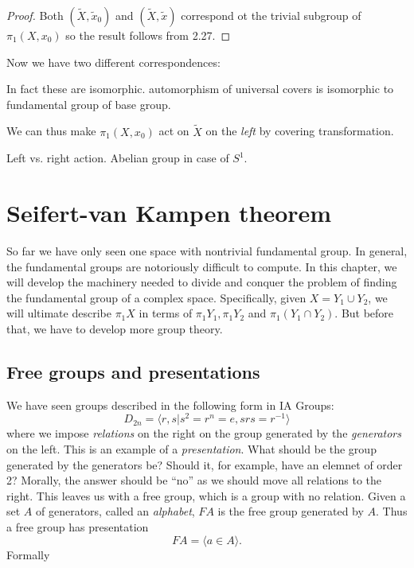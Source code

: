 \documentclass[a4paper]{article}
\begin{document}
\begin{proof}
  Both \((\tilde X, \tilde x_0)\) and \((\tilde X, \tilde x)\) correspond ot the trivial subgroup of \(\pi_1(X, x_0)\) so the result follows from 2.27.
\end{proof}

Now we have two different correspondences:

\blindtext

In fact these are isomorphic. automorphism of universal covers is isomorphic to fundamental group of base group.

We can thus make \(\pi_1(X, x_0)\) act on \(\tilde X\) on the \emph{left} by covering transformation.
\begin{remark}
  Left vs. right action. Abelian group in case of \(S^1\).
\end{remark}

\section{Seifert-van Kampen theorem}

So far we have only seen one space with nontrivial fundamental group. In general, the fundamental groups are notoriously difficult to compute. In this chapter, we will develop the machinery needed to divide and conquer the problem of finding the fundamental group of a complex space. Specifically, given \(X = Y_1 \cup Y_2\), we will ultimate describe \(\pi_1X\) in terms of \(\pi_1Y_1, \pi_1Y_2\) and \(\pi_1(Y_1 \cap Y_2)\). But before that, we have to develop more group theory.

\subsection{Free groups and presentations}

We have seen groups described in the following form in IA Groups:
\[
  D_{2n} = \langle r, s | s^2 = r^n = e, srs = r^{-1} \rangle
\]
where we impose \emph{relations} on the right on the group generated by the \emph{generators} on the left. This is an example of a \emph{presentation}. What should be the group generated by the generators be? Should it, for example, have an elemnet of order 2? Morally, the answer should be ``no'' as we should move all relations to the right. This leaves us with a free group, which is a group with no relation. Given a set \(A\) of generators, called an \emph{alphabet}, \(FA\) is the free group generated by \(A\). Thus a free group has presentation
\[
  FA = \langle a \in A \rangle.
\]
Formally
\end{document}
